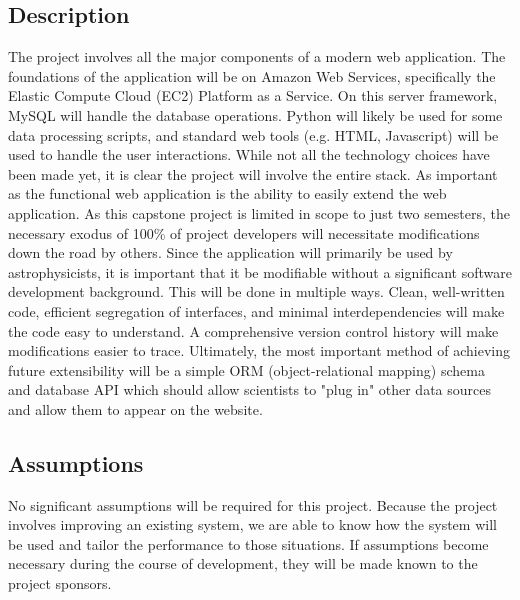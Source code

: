 \documentclass[12pt]{article}
\begin{document}
\begin{spacing}{1.5}
\subsection{Description}
The project involves all the major components of a modern web application. The foundations of the application will be on Amazon Web Services, specifically the Elastic Compute Cloud (EC2) Platform as a Service. On this server framework, MySQL will handle the database operations. Python will likely be used for some data processing scripts, and standard web tools (e.g. HTML, Javascript) will be used to handle the user interactions. While not all the technology choices have been made yet, it is clear the project will involve the entire stack.
\newline \newline
As important as the functional web application is the ability to easily extend the web application. As this capstone project is limited in scope to just two semesters, the necessary exodus of 100\% of project developers will necessitate modifications down the road by others. Since the application will primarily be used by astrophysicists, it is important that it be modifiable without a significant software development background. This will be done in multiple ways. Clean, well-written code, efficient segregation of interfaces, and minimal interdependencies will make the code easy to understand. A comprehensive version control history will make modifications easier to trace. Ultimately, the most important method of achieving future extensibility will be a simple ORM (object-relational mapping) schema and database API which should allow scientists to "plug in" other data sources and allow them to appear on the website.

\subsection{Assumptions}
No significant assumptions will be required for this project. Because the project involves improving an existing system, we are able to know how the system will be used and tailor the performance to those situations. If assumptions become necessary during the course of development, they will be made known to the project sponsors.

\newpage


\end{spacing}
\end{document}
